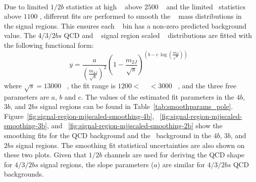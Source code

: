 \paragraph{} 
Due to limited $1/2b$ statistics at high \mtwoJ~ above $2500$ \GeV~ and the limited \ttbar~statistics above $1100$ \GeV, different fits are performed to smooth the \mtwoJ~ mass distributions in the signal regions.
This ensures each \mtwoJ~ bin has a non-zero predicted background value.
The $4/3/2bs$ QCD and \ttbar~ signal region scaled \mtwoJ~ distributions are fitted with the following functional form:
\begin{equation}
\label{eq:boosted_dijet}
y = \frac{a}{(\frac{m_{2J}}{\sqrt{s}})^2} (1-\frac{m_{2J}}{\sqrt{s}})^{(b - c\ \log(\frac{m_{2J}}{\sqrt{s}}))}
\end{equation}
where $\sqrt{s} = 13000$ \GeV~, the fit range is $1200 <$ \mtwoJ~ $< 3000$ \GeV~, and the three free parameters are $a$, $b$ and $c$.
The values of the estimated fit parameters in the $4b$, $3b$, and $2bs$ signal regions can be found in Table~\ref{tab:smoothparams_pole}.
Figure~\ref{fig:signal-region-mjjscaled-smoothing-4b}, ~\ref{fig:signal-region-mjjscaled-smoothing-3b}, and ~\ref{fig:signal-region-mjjscaled-smoothing-2b} show the smoothing fits for the QCD background and the \ttbar\ background in the $4b$, $3b$, and $2bs$ signal regions.
The smoothing fit statistical uncertainties are also shown on these two plots. 
Given that $1/2b$ channels are used for deriving the QCD shape for $4/3/2bs$ signal regions, the slope parameters ($a$) are similar for $4/3/2bs$ QCD backgrounds.


